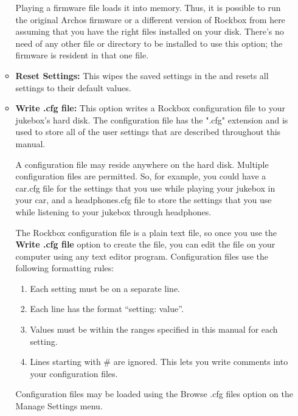 \begin{itemize}
\begin{itemize}
{      Playing a firmware file loads it into memory.  Thus, it is possible to run the original Archos firmware or a different version of Rockbox from here assuming that you have the right files installed on your disk.  There's no need of any other file or directory to be installed to use this option; the firmware is resident in that one file.
      }
    \item \textbf{Reset Settings: }
      This wipes the saved settings in the \dap and resets all settings to their default values.
    \item \textbf{Write .cfg file: }
			This option writes a Rockbox configuration file to your jukebox's hard disk. The configuration file has the ".cfg" extension and is used to store all of the user settings that are described throughout this manual.

			A configuration file may reside anywhere on the hard disk. Multiple configuration files are permitted. So, for example, you could have a car.cfg file for the settings that you use while playing your jukebox in your car, and a headphones.cfg file to store the settings that you use while listening to your jukebox through headphones.

			The Rockbox configuration file is a plain text file, so once you use the \textbf{Write .cfg file} option to create the file, you can edit the file on your computer using any text editor program. Configuration files use the following formatting rules:

			\begin{enumerate}   
			\item Each setting must be on a separate line.
			\item Each line has the format ``setting: value''. 
			\item Values must be within the ranges specified in this manual for each setting.
			\item Lines starting with \# are ignored. This lets you write comments into your configuration files.
			\end{enumerate}

			Configuration files may be loaded using the Browse .cfg files option on the Manage Settings menu.


\end{itemize}
\end{itemize}
